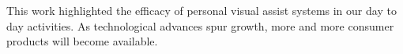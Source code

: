 This work highlighted the efficacy of personal visual assist systems in our day to day activities. As technological advances spur growth, more and more 
consumer products will become available. 
